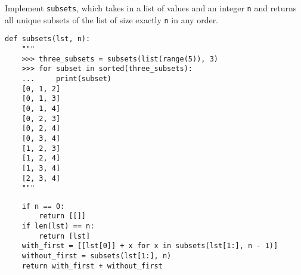 \begin{blocksection}
\question Implement \lstinline$subsets$, which takes in a list of values and an
integer \lstinline$n$ and returns all unique subsets of the list of size exactly
\lstinline$n$ in any order.

\begin{lstlisting}
def subsets(lst, n):
    """
    >>> three_subsets = subsets(list(range(5)), 3)
    >>> for subset in sorted(three_subsets):
    ...     print(subset)
    [0, 1, 2]
    [0, 1, 3]
    [0, 1, 4]
    [0, 2, 3]
    [0, 2, 4]
    [0, 3, 4]
    [1, 2, 3]
    [1, 2, 4]
    [1, 3, 4]
    [2, 3, 4]
    """
\end{lstlisting}

\begin{solution}[1.5in]
\begin{lstlisting}
    if n == 0:
        return [[]]
    if len(lst) == n:
        return [lst]
    with_first = [[lst[0]] + x for x in subsets(lst[1:], n - 1)]
    without_first = subsets(lst[1:], n)
    return with_first + without_first
\end{lstlisting}
\end{solution}
\end{blocksection}
